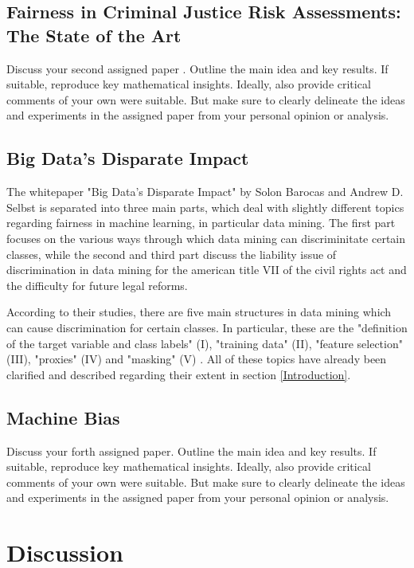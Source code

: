 \documentclass{article}
\begin{document}
\subsection{Fairness in Criminal Justice Risk Assessments: The State of the Art}

Discuss your second assigned paper \cite{Berk.2018}. Outline the main idea and key results. If suitable, reproduce key mathematical insights. Ideally, also provide critical comments of your own were suitable. But make sure to clearly delineate the ideas and experiments in the assigned paper from your personal opinion or analysis.

\subsection{Big Data’s Disparate Impact}
The whitepaper "Big Data’s Disparate Impact" \cite{Barocas.2016} by Solon Barocas and Andrew D. Selbst is separated into three main parts, which deal with slightly different topics regarding fairness in machine learning, in particular data mining. The first part focuses on the various ways through which data mining can discriminitate certain classes, while the second and third part discuss the liability issue of discrimination in data mining for the american title VII of the civil rights act and the difficulty for future legal reforms.

According to their studies, there are five main structures in data mining which can cause discrimination for certain classes. In particular, these are the "definition of the target variable and class labels" (I), "training data" (II), "feature selection" (III), "proxies" (IV) and "masking" (V) \cite{Barocas.2016}. All of these topics have already been clarified and described regarding their extent in section \ref{Introduction}.

\subsection{Machine Bias}

Discuss your forth assigned paper. Outline the main idea and key results. If suitable, reproduce key mathematical insights. Ideally, also provide critical comments of your own were suitable. But make sure to clearly delineate the ideas and experiments in the assigned paper from your personal opinion or analysis.

\section{Discussion}
\end{document}
